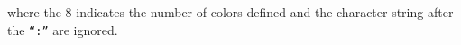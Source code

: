 \documentclass[11pt,twoside]{book}
\newcommand{\hitem}[1]{\item[{\bf #1} \hfill]}
\begin{document}
\noindent where the 8 indicates the number of colors defined and
the character string after the {\tt ``:''} are ignored.

%
%
%
%
\end{document}
